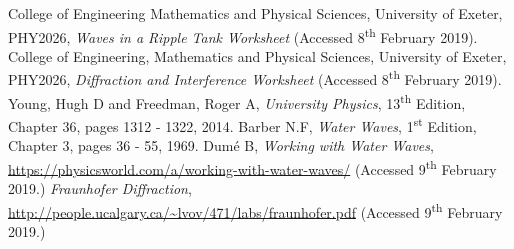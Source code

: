 \documentclass{article}
\begin{document}
\begin{thebibliography}{9}
 College of Engineering Mathematics and Physical Sciences, University of Exeter, PHY2026, \textit{Waves in a Ripple Tank Worksheet} (Accessed 8\textsuperscript{th} February 2019).
 College of Engineering, Mathematics and Physical Sciences, University of Exeter, PHY2026, \textit{Diffraction and Interference Worksheet} (Accessed 8\textsuperscript{th} February 2019).
 Young, Hugh D and Freedman, Roger A, \textit{University Physics}, 13\textsuperscript{th} Edition, Chapter 36, pages 1312 - 1322, 2014.
 Barber N.F, \textit{Water Waves}, 1\textsuperscript{st} Edition, Chapter 3, pages 36 - 55, 1969. 
 Dum\'e B, \textit{Working with Water Waves}, \url{https://physicsworld.com/a/working-with-water-waves/} (Accessed 9\textsuperscript{th} February 2019.)
 \textit{Fraunhofer Diffraction}, \url{http://people.ucalgary.ca/~lvov/471/labs/fraunhofer.pdf} (Accessed 9\textsuperscript{th} February 2019.)

\end{thebibliography}
\end{document}
